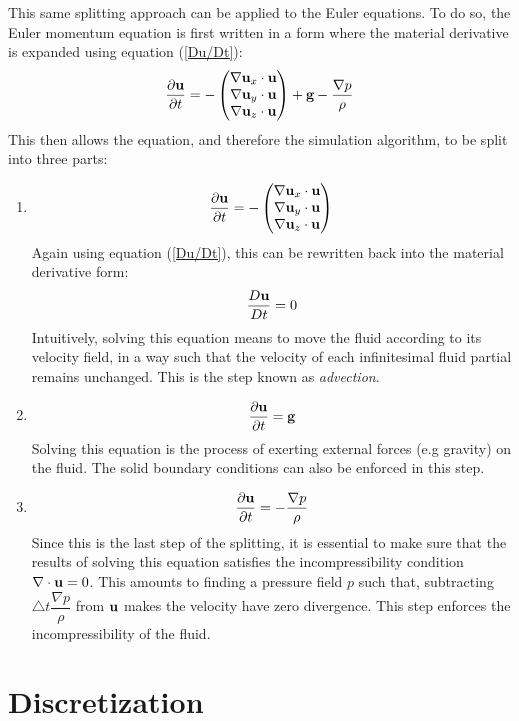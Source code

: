 This same splitting approach can be applied to the Euler equations. To do so, the Euler momentum equation is first written in a form where the material derivative is expanded using equation (\ref{Du/Dt}):
$$
\frac{\partial \textbf{u}}{\partial t}   =  -\begin{pmatrix}
    \nabla \textbf{u}_x  \cdot \textbf{u}\\
     \nabla \textbf{u}_y \cdot \textbf{u}\\
     \nabla \textbf{u}_z \cdot \textbf{u}
  \end{pmatrix}
  + \textbf{g}
  -\frac{\nabla p}{\rho} 
$$
This then allows the equation, and therefore the simulation algorithm, to be split into three parts:
\begin{enumerate}
    \item
    $$
    \frac{\partial \textbf{u}}{\partial t}   =  -\begin{pmatrix}
        \nabla \textbf{u}_x  \cdot \textbf{u}\\
         \nabla \textbf{u}_y \cdot \textbf{u}\\
         \nabla \textbf{u}_z \cdot \textbf{u}\end{pmatrix} 
    $$
    Again using equation (\ref{Du/Dt}), this can be rewritten back into the material derivative form:
    $$
    \dfrac{D\textbf{u}}{Dt} = 0
    $$
    Intuitively, solving this equation means to move the fluid according to its velocity field, in a way such that the velocity of each infinitesimal fluid partial remains unchanged. This is the step known as \textit{advection}. 

    \item
    $$
    \frac{\partial \textbf{u}}{\partial t}   = \textbf{g}
    $$
    Solving this equation is the process of exerting external forces (e.g gravity) on the fluid. The solid boundary conditions can also be enforced in this step.

    \item
    $$
    \frac{\partial \textbf{u}}{\partial t}   = -\frac{\nabla p}{\rho} 
    $$
    Since this is the last step of the splitting, it is essential to make sure that the results of solving this equation satisfies the incompressibility condition $\nabla \cdot \textbf{u} = 0$. This amounts to finding a pressure field $p$ such that, subtracting $\triangle t \dfrac{\nabla p}{\rho}$ from $\textbf{u}$ makes the velocity have zero divergence. This step enforces the incompressibility of the fluid.

\end{enumerate}



\section{Discretization}

